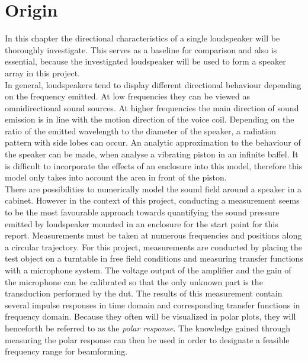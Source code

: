 \section{Origin}\label{ch:polar_response}
In this chapter the directional characteristics of a single loudspeaker will be thoroughly investigate. This serves as a baseline for comparison and also is essential, because the investigated loudspeaker will be used to form a speaker array in this project.\\
In general, loudspeakers tend to display different directional behaviour depending on the frequency emitted. At low frequencies they can be viewed as omnidirectional sound sources. At higher frequencies the main direction of sound emission is in line with the motion direction of the voice coil. \citep[p. 910 f.]{crocker98}
Depending on the ratio of the emitted wavelength to the diameter of the speaker, a radiation pattern with side lobes can occur. An analytic approximation to the behaviour of the speaker can be made, when analyse a vibrating piston in an infinite baffel. It is difficult to incorporate the effects of an enclosure into this model, therefore this model only takes into account the area in front of the piston.\\
There are possibilities to numerically model the sound field around a speaker in a cabinet. However in the context of this project, conducting a measurement seems to be the most favourable approach towards quantifying the sound pressure emitted by loudspeaker mounted in an enclosure for the start point for this report. Measurements must be taken at numerous frequencies and positions along a circular trajectory.
For this project, measurements are conducted by placing the test object on a turntable in free field conditions and measuring transfer functions with a microphone system. The voltage output of the amplifier and the gain of the microphone can be calibrated so that the only unknown part is the transduction performed by the \gls{dut}. The results of this measurement contain several  impulse responses in time domain and corresponding transfer functions in frequency domain. Because they  often will be visualized in polar plots, they will henceforth be referred to as the \textit{polar response}.
The knowledge gained through measuring the polar response can then be used in order to designate a feasible frequency range for beamforming. 

